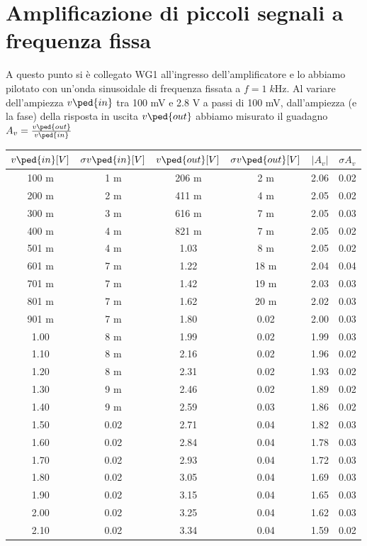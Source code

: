 \documentclass[10pt, a4paper, italian]{article}
\begin{document}
\section{Amplificazione di piccoli segnali a frequenza fissa}
A questo punto si è collegato WG1 all'ingresso dell'amplificatore e lo
abbiamo pilotato con un'onda sinusoidale di frequenza fissata a
$f = 1 \; \si{k\Hz}$. Al variare dell'ampiezza $v\ped{in}$ tra 100 mV e 2.8 V
a passi di 100 mV, dall'ampiezza (e la fase) della risposta in uscita
$v\ped{out}$ abbiamo misurato il guadagno $A_v = \frac{v\ped{out}}{v\ped{in}}$
\begin{table}[H]
\centering
\begin{tabular}{cccccc}
\toprule
$v\ped{in} [V]$ & $\sigma v\ped{in}[V]$ & $v\ped{out} [V]$ &
$\sigma v\ped{out} [V]$ & $|A_v|$ & $\sigma A_v$ \\
\midrule
\midrule
100 m & 1 m  & 206 m & 2 m   & 2.06 & 0.02 \\
200 m & 2 m  & 411 m & 4 m   & 2.05 & 0.02 \\
300 m & 3 m  & 616 m & 7 m  & 2.05 & 0.03 \\
400 m & 4 m  & 821 m & 7 m  & 2.05 & 0.02 \\
501 m & 4 m  & 1.03  & 8 m  & 2.05 & 0.02 \\
601 m & 7 m  & 1.22  & 18 m & 2.04 & 0.04 \\
701 m & 7 m  & 1.42  & 19 m & 2.03 & 0.03 \\
801 m & 7 m  & 1.62  & 20 m & 2.02 & 0.03 \\
901 m & 7 m  & 1.80  & 0.02 & 2.00 & 0.03 \\
1.00  & 8 m  & 1.99  & 0.02 & 1.99 & 0.03 \\
1.10  & 8 m  & 2.16  & 0.02 & 1.96 & 0.02 \\
1.20  & 8 m  & 2.31  & 0.02 & 1.93 & 0.02 \\
1.30  & 9 m  & 2.46  & 0.02 & 1.89 & 0.02 \\
1.40  & 9 m  & 2.59  & 0.03 & 1.86 & 0.02 \\
1.50  & 0.02 & 2.71  & 0.04 & 1.82 & 0.03 \\
1.60  & 0.02 & 2.84  & 0.04 & 1.78 & 0.03 \\
1.70  & 0.02 & 2.93  & 0.04 & 1.72 & 0.03 \\
1.80  & 0.02 & 3.05  & 0.04 & 1.69 & 0.03 \\
1.90  & 0.02 & 3.15  & 0.04 & 1.65 & 0.03 \\
2.00  & 0.02 & 3.25  & 0.04 & 1.62 & 0.03 \\
2.10  & 0.02 & 3.34  & 0.04 & 1.59 & 0.02 \\

\end{tabular}
\end{table}
\end{document}
